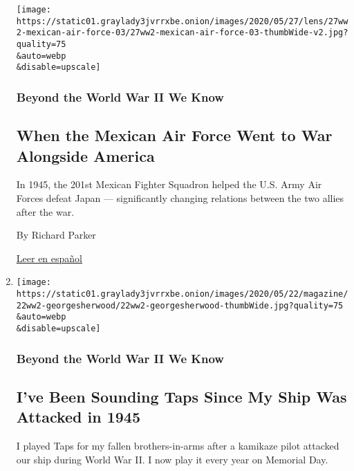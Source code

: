 \begin{enumerate}
  \texttt{[image: https://static01.graylady3jvrrxbe.onion/images/2020/05/27/lens/27ww2-mexican-air-force-03/27ww2-mexican-air-force-03-thumbWide-v2.jpg?quality=75\\\&auto=webp\\\&disable=upscale]}

  \hypertarget{beyond-the-world-war-ii-we-know-8}{%
  \subsubsection{Beyond the World War II We
  Know}\label{beyond-the-world-war-ii-we-know-8}}

  \hypertarget{when-the-mexican-air-force-went-to-war-alongside-america}{%
  \subsection{When the Mexican Air Force Went to War Alongside
  America}\label{when-the-mexican-air-force-went-to-war-alongside-america}}

  In 1945, the 201st Mexican Fighter Squadron helped the U.S. Army Air
  Forces defeat Japan --- significantly changing relations between the
  two allies after the war.

  By Richard Parker

  \href{https://www.nytimes3xbfgragh.onion/es/2020/05/27/magazine/mexico-escuadron-201-segunda-guerra-mundial.html}{Leer
  en español}
\item
  \href{/2020/05/21/magazine/taps-memorial-day.html}{}

  \texttt{[image: https://static01.graylady3jvrrxbe.onion/images/2020/05/22/magazine/22ww2-georgesherwood/22ww2-georgesherwood-thumbWide.jpg?quality=75\\\&auto=webp\\\&disable=upscale]}

  \hypertarget{beyond-the-world-war-ii-we-know-9}{%
  \subsubsection{Beyond the World War II We
  Know}\label{beyond-the-world-war-ii-we-know-9}}

  \hypertarget{ive-been-sounding-taps-since-my-ship-was-attacked-in-1945}{%
  \subsection{I've Been Sounding Taps Since My Ship Was Attacked in
  1945}\label{ive-been-sounding-taps-since-my-ship-was-attacked-in-1945}}

  I played Taps for my fallen brothers-in-arms after a kamikaze pilot
  attacked our ship during World War II. I now play it every year on
  Memorial Day.


\end{enumerate}
